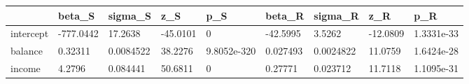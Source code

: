 \begin{tabular}{lllllllll}
& beta_S & sigma_S & z_S & p_S & beta_R & sigma_R & z_R & p_R \\ 
\hline 
intercept & -777.0442 & 17.2638 & -45.0101 & 0 & -42.5995 & 3.5262 & -12.0809 & 1.3331e-33 \\ 
balance & 0.32311 & 0.0084522 & 38.2276 & 9.8052e-320 & 0.027493 & 0.0024822 & 11.0759 & 1.6424e-28 \\ 
income & 4.2796 & 0.084441 & 50.6811 & 0 & 0.27771 & 0.023712 & 11.7118 & 1.1095e-31 \\ 
\hline 
\end{tabular}